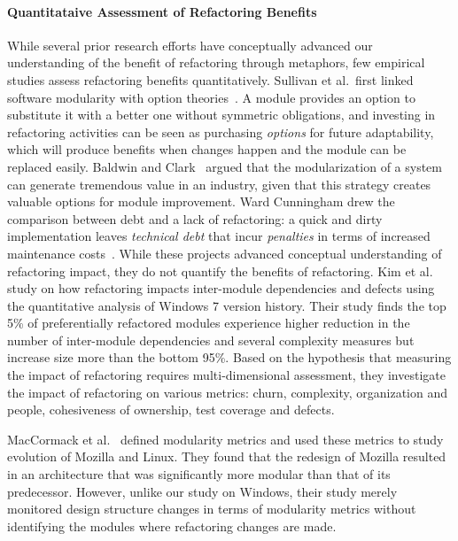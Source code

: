 \documentclass[runningheads,a4paper]{llncs}
\begin{document}
\paragraph{Quantitataive Assessment of Refactoring Benefits} 
While several prior research efforts have conceptually advanced our understanding of the benefit of refactoring through metaphors, few empirical studies assess refactoring benefits quantitatively. Sullivan et al.~first linked software modularity with option theories~\cite{Sullivan1998:option}. A module provides an option to substitute it with a better one without symmetric obligations, and investing in refactoring activities can be seen as purchasing \emph{options} for future adaptability, which will produce benefits when changes happen and the module can be replaced easily. Baldwin and Clark~\cite{Baldwin1999:designrule} argued that the modularization of a system can generate tremendous value in an industry, given that this strategy creates valuable options for module improvement. Ward Cunningham drew the comparison between debt and a lack of refactoring: a quick and dirty implementation leaves {\em technical debt} that incur \emph{penalties} in terms of increased maintenance costs~\cite{Cunningham1992:td}. While these projects advanced conceptual understanding of refactoring impact, they do not quantify the benefits of refactoring.  Kim et al.~\cite{Kim2014:microsoft} study on how refactoring impacts inter-module dependencies and defects using the quantitative analysis of Windows 7 version history. Their study finds the top 5\% of preferentially refactored modules experience higher reduction in the number of inter-module dependencies and several complexity measures but increase size more than the bottom 95\%. Based on the hypothesis that measuring the impact of refactoring requires multi-dimensional assessment, they investigate the impact of refactoring on various metrics: churn, complexity, organization and people, cohesiveness of ownership, test coverage and defects.     

MacCormack et al.~\cite{MacCormack2006:study} defined modularity metrics and used these metrics to study evolution of Mozilla and Linux. They found that the redesign of Mozilla resulted in an architecture that was significantly more modular than that of its predecessor. However, unlike our study on Windows, their study merely monitored design structure changes in terms of modularity metrics without identifying the modules where refactoring changes are made. 
\end{document}
